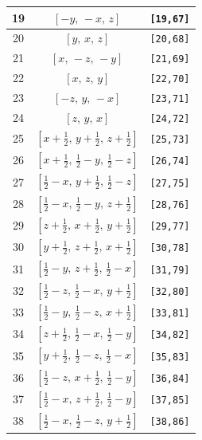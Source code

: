 \documentclass[fleqn,8pt]{jsarticle}
\begin{document}
\begin{longtable}{ccc}
19 & $\left[ - y,\, - x,\, z \right]$ & {\tt [19,67]} \\ \hline
20 & $\left[ y,\, x,\, z \right]$ & {\tt [20,68]} \\ \hline
21 & $\left[ x,\, - z,\, - y \right]$ & {\tt [21,69]} \\ \hline
22 & $\left[ x,\, z,\, y \right]$ & {\tt [22,70]} \\ \hline
23 & $\left[ - z,\, y,\, - x \right]$ & {\tt [23,71]} \\ \hline
24 & $\left[ z,\, y,\, x \right]$ & {\tt [24,72]} \\ \hline
25 & $\left[ x + \frac{1}{2},\, y + \frac{1}{2},\, z + \frac{1}{2} \right]$ & {\tt [25,73]} \\ \hline
26 & $\left[ x + \frac{1}{2},\, \frac{1}{2} - y,\, \frac{1}{2} - z \right]$ & {\tt [26,74]} \\ \hline
27 & $\left[ \frac{1}{2} - x,\, y + \frac{1}{2},\, \frac{1}{2} - z \right]$ & {\tt [27,75]} \\ \hline
28 & $\left[ \frac{1}{2} - x,\, \frac{1}{2} - y,\, z + \frac{1}{2} \right]$ & {\tt [28,76]} \\ \hline
29 & $\left[ z + \frac{1}{2},\, x + \frac{1}{2},\, y + \frac{1}{2} \right]$ & {\tt [29,77]} \\ \hline
30 & $\left[ y + \frac{1}{2},\, z + \frac{1}{2},\, x + \frac{1}{2} \right]$ & {\tt [30,78]} \\ \hline
31 & $\left[ \frac{1}{2} - y,\, z + \frac{1}{2},\, \frac{1}{2} - x \right]$ & {\tt [31,79]} \\ \hline
32 & $\left[ \frac{1}{2} - z,\, \frac{1}{2} - x,\, y + \frac{1}{2} \right]$ & {\tt [32,80]} \\ \hline
33 & $\left[ \frac{1}{2} - y,\, \frac{1}{2} - z,\, x + \frac{1}{2} \right]$ & {\tt [33,81]} \\ \hline
34 & $\left[ z + \frac{1}{2},\, \frac{1}{2} - x,\, \frac{1}{2} - y \right]$ & {\tt [34,82]} \\ \hline
35 & $\left[ y + \frac{1}{2},\, \frac{1}{2} - z,\, \frac{1}{2} - x \right]$ & {\tt [35,83]} \\ \hline
36 & $\left[ \frac{1}{2} - z,\, x + \frac{1}{2},\, \frac{1}{2} - y \right]$ & {\tt [36,84]} \\ \hline
37 & $\left[ \frac{1}{2} - x,\, z + \frac{1}{2},\, \frac{1}{2} - y \right]$ & {\tt [37,85]} \\ \hline
38 & $\left[ \frac{1}{2} - x,\, \frac{1}{2} - z,\, y + \frac{1}{2} \right]$ & {\tt [38,86]} \\ \hline

\end{longtable}
\end{document}
